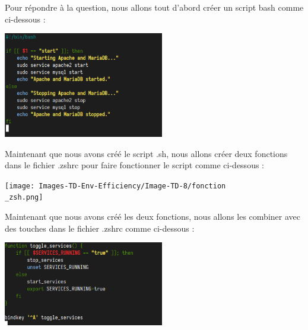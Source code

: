 \documentclass[12pt]{article}
\begin{document}
Pour répondre à la question, nous allons tout d'abord créer un script bash comme ci-dessous :

\vspace{0.3cm}

\begin{center}
  \includegraphics[width=7cm]{Images-TD-Env-Efficiency/Image-TD-8/Sevices.png}
\end{center}

\vspace{0.3cm}

Maintenant que nous avons créé le script .sh, nous allons créer deux fonctions dans le fichier .zshrc pour faire fonctionner le script comme ci-dessous :

\vspace{0.3cm}

\begin{center}
  \texttt{[image: Images-TD-Env-Efficiency/Image-TD-8/fonction\\\_zsh.png]}
\end{center}

\vspace{0.3cm}

Maintenant que nous avons créé les deux fonctions, nous allons les combiner avec des touches dans le fichier .zshrc comme ci-dessous :

\vspace{0.3cm}

\begin{center}
  \includegraphics[width=7cm]{Images-TD-Env-Efficiency/Image-TD-8/bindkey.png}
\end{center}

\vspace{0.3cm}
\end{document}
